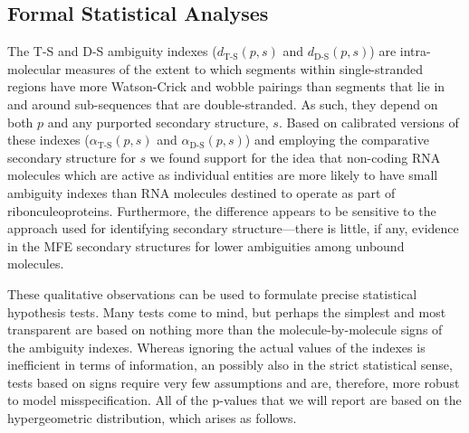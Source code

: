 \documentclass[10pt,letterpaper]{article}
\begin{document}
\subsection*{Formal Statistical Analyses}
The T-S and D-S ambiguity indexes ($d_\text{T-S}(p,s)$ and $d_\text{D-S}(p,s)$)  are intra-molecular measures of the extent to which segments within single-stranded regions have more Watson-Crick and wobble pairings than segments that lie in and around sub-sequences that are double-stranded. As such, they depend on both $p$ and any purported secondary structure, $s$. Based on calibrated versions of these indexes ($\alpha_\text{T-S}(p,s)$ and $\alpha_\text{D-S}(p,s)$) and employing the comparative secondary structure for $s$ we found support for the idea that non-coding RNA molecules which are active as individual entities are more likely to have small ambiguity indexes than RNA molecules destined to operate as part of ribonculeoproteins. Furthermore, the difference appears to be sensitive to the approach used for identifying secondary structure---there is little, if any, evidence in the MFE secondary structures for lower ambiguities among unbound molecules.

These qualitative observations can be used to formulate precise statistical hypothesis tests.  Many tests come to mind, but perhaps the simplest and most transparent are based on nothing more than the molecule-by-molecule signs of the ambiguity indexes. Whereas ignoring the actual values of the indexes is inefficient in terms of information, an possibly also in the strict statistical sense, tests based on signs require very few assumptions and are, therefore, more robust to model misspecification. All of the p-values that we will report are based on the hypergeometric distribution, which arises as follows.
\end{document}
